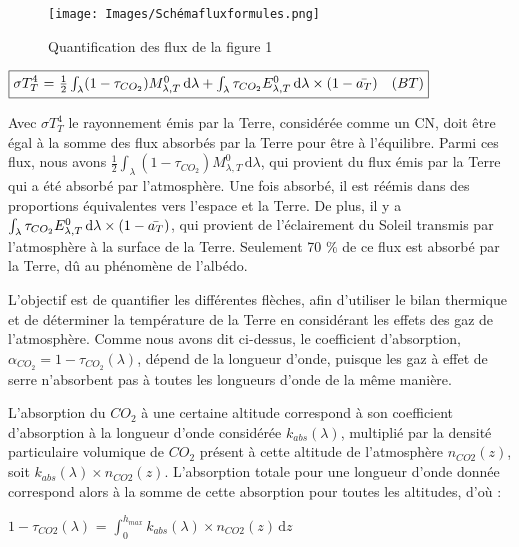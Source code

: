 \documentclass[a4paper, 12pt]{report} %
\newcommand{\figcaptionwithsource}[3]{\caption[#1 
            \newline #2]{#1} \addtocontents{lof}{\protect\vspace{1\baselineskip}}}
\begin{document}
\begin{figure}[H]
    \begin{center}
    \texttt{[image: Images/Schémafluxformules.png]}
    \figcaptionwithsource{Quantification des flux de la figure 1}{\textit{Biorender}}{fig:figure1}
    \label{fig:figure1}
    \end{center} 
\end{figure}

\begin{center}
$\boxed{\sigma T_T^4$ = $\frac{1}{2} \int_{\lambda}^{} (1-\tau_{CO_2})M^{0}_{\lambda,T} \, \mathrm{d}\lambda 
                + \int_{\lambda}^{} \tau_{CO_2}E^{0}_{\lambda,T} \, \mathrm{d}\lambda \times (1-\Bar{a_T})
\ \ \ (BT)}$
\end{center}

    Avec $\sigma T_T^4$ le rayonnement émis par la Terre, considérée 
comme un CN, doit être égal à la somme des flux absorbés par la Terre pour être à  l'équilibre. Parmi ces flux, nous avons $\frac{1}{2} \int_{\lambda}^{} (1-\tau_{CO_2})M^{0}_{\lambda,T} \, \mathrm{d}\lambda$, qui provient du flux émis par la Terre qui a été absorbé par l'atmosphère. Une fois absorbé, il est réémis dans des proportions équivalentes vers l'espace et la Terre. De plus, il y a $\int_{\lambda}^{} \tau_{CO_2}E^{0}_{\lambda,T} \, \mathrm{d}\lambda \times (1-\Bar{a_T})$, qui provient de l'éclairement du Soleil transmis par l'atmosphère à la surface de la Terre. Seulement 70 $\%$ de ce flux est absorbé par la Terre, dû au phénomène de l'albédo. \vspace{\baselineskip}

L’objectif est de quantifier les différentes flèches, afin d’utiliser le bilan thermique et de déterminer la température de la Terre en considérant les effets des gaz de l’atmosphère. Comme nous avons dit ci-dessus, le coefficient d'absorption, $\alpha_{CO_2} = 1 - \tau_{CO_2}(\lambda)$, dépend de la longueur d’onde, puisque les gaz à effet de serre n'absorbent pas à toutes les longueurs d'onde de la même manière. \vspace{\baselineskip}

L'absorption du $CO_2$ à une certaine altitude correspond à son coefficient d'absorption à la longueur d'onde considérée $k_{abs}(\lambda)$, multiplié par la densité particulaire volumique de $CO_2$ présent à cette altitude de l'atmosphère $n_{CO2}(z)$, soit $k_{abs}(\lambda) \times n_{CO2}(z)$. L'absorption totale pour une longueur d'onde donnée correspond alors à la somme de cette absorption pour toutes les altitudes, d'où : 
\begin{center}
    $1-\tau_{CO2}(\lambda)$ = $\int_{0}^{h_{max}} k_{abs}(\lambda) \times n_{CO2}(z) \, \mathrm{d}z$
\end{center}
\end{document}
